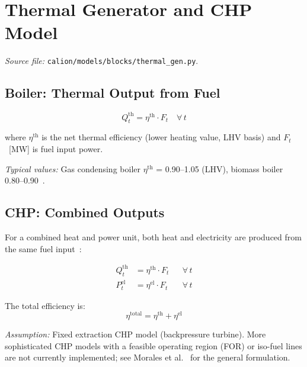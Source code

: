 \documentclass[a4paper,12pt]{article}
\begin{document}
\section{Thermal Generator and CHP Model}
\label{sec:gen}

\textit{Source file:} \texttt{calion/models/blocks/thermal\_gen.py}.

\subsection{Boiler: Thermal Output from Fuel}

\begin{equation}
  Q^{\text{th}}_{t} = \eta^{\text{th}} \cdot F_{t}
  \quad \forall\, t
  \tag{GEN-1}
  \label{eq:gen1}
\end{equation}

where $\eta^{\text{th}}$ is the net thermal efficiency (lower heating value, LHV basis) and
$F_{t}$~[MW] is fuel input power.

\noindent\textit{Typical values:} Gas condensing boiler $\eta^{\text{th}}$ = 0.90–1.05
(LHV), biomass boiler 0.80–0.90~\cite{Eurostat2023}.

\subsection{CHP: Combined Outputs}

For a combined heat and power unit, both heat and electricity are produced from the same
fuel input~\cite{Morales2014}:

\begin{align}
  Q^{\text{th}}_{t} &= \eta^{\text{th}} \cdot F_{t} && \forall\, t \tag{GEN-2} \label{eq:gen2} \\
  P^{\text{el}}_{t} &= \eta^{\text{el}} \cdot F_{t} && \forall\, t \tag{GEN-3} \label{eq:gen3}
\end{align}

The total efficiency is:
\begin{equation}
  \eta^{\text{total}} = \eta^{\text{th}} + \eta^{\text{el}}
  \label{eq:total-eff}
\end{equation}

\noindent\textit{Assumption:} Fixed extraction CHP model (backpressure turbine). More
sophisticated CHP models with a feasible operating region (FOR) or iso-fuel lines are not
currently implemented; see Morales et al.~\cite{Morales2014} for the general formulation.
\end{document}
